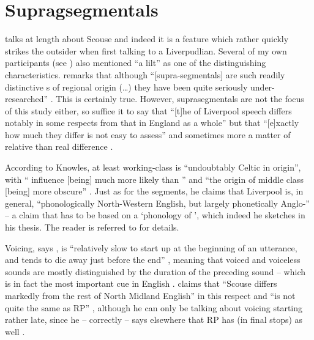 	\section{Supragsegmentals}\label{sec.var.supra}

\citet{knowles1973} talks at length about Scouse  and indeed it is a feature which rather quickly strikes the outsider when first talking to a Liverpudlian.
Several of my own participants (see ) also mentioned ``a lilt'' as one of the distinguishing characteristics.
\citeauthor{wales2006} remarks that although ``[supra-segmentals] are such readily distinctive s of regional origin (\ldots) they have been quite seriously under-researched'' \citeyearpar[201]{wales2006}.
This is certainly true.
However, suprasegmentals are not the focus of this study either, so suffice it to say that ``[t]he  of Liverpool speech differs notably in some respects from that in England as a whole'' but that ``[e]xactly how much they differ is not easy to assess'' \citep[221]{knowles1973} and sometimes more a matter of relative  than real difference \citep[cf.][176]{knowles1973}.

According to Knowles, at least working-class  is ``undoubtably Celtic in origin'', with `` influence [being] much more likely than '' \citep[221--222]{knowles1973} and ``the origin of middle class   [being] more obscure'' \citep[222--223]{knowles1973}.
Just as for the segments, he claims that Liverpool  is, in general, ``phonologically North-Western English, but largely phonetically Anglo-'' \citep[225]{knowles1973} -- a claim that has to be based on a `phonology of ', which indeed he sketches in his thesis.
The reader is referred to \citet[174--226]{knowles1973} for details.

Voicing, says \citeauthor{knowles1973}, is ``relatively slow to start up at the beginning of an utterance, and tends to die away just before the end'' \citeyearpar[246]{knowles1973}, meaning that voiced and voiceless sounds are mostly distinguished by the duration of the preceding sound -- which is in fact the most important cue in English \citep[cf., for instance,][]{hoganrozsypal1980}. \citeauthor{knowles1973} claims that ``Scouse differs markedly from the rest of North Midland English'' in this respect and ``is not quite the same as RP'' \citeyearpar[246]{knowles1973}, although he can only be talking about voicing starting rather late, since he -- correctly -- says elsewhere that RP has  (in final stops) as well \citeyearpar[cf.][114]{knowles1973}.

